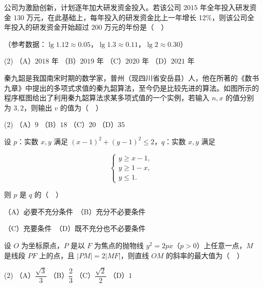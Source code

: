 \begin{question}
公司为激励创新，计划逐年加大研发资金投入。若该公司 \(2015\) 年全年投入研发资金 \(130\) 万元，在此基础上，每年投入的研发资金比上一年增长 12\%，则该公司全年投入的研发资金开始超过 \(200\) 万元的年份是（　）

（参考数据：\(\lg 1.12\approx 0.05\)，\(\lg 1.3\approx 0.11\)，\(\lg 2\approx 0.30\)）

\begin{gkopts}(2)
\task （A）\(2018\) 年
\task （B）\(2019\) 年
\task （C）\(2020\) 年
\task （D）\(2021\) 年
\end{gkopts}

\Needspace{0.4\textheight}
\end{question}
\begin{question}
秦九韶是我国南宋时期的数学家，普州（现四川省安岳县）人，他在所著的《数书九章》中提出的多项式求值的秦九韶算法，至今仍是比较先进的算法。如图所示的程序框图给出了利用秦九韶算法求某多项式值的一个实例，若输入 \(n,x\) 的值分别为 \(3,2\)，则输出 \(v\) 的值为（　）
\nopagebreak[4]
\begin{center}\end{center}
\nopagebreak[4]
\begin{gkopts}(2)
\task （A）\(9\)
\task （B）\(18\)
\task （C）\(20\)
\task （D）\(35\)
\end{gkopts}

\end{question}
\begin{question}
设 \(p\)：实数 \(x,y\) 满足 \((x-1)^{2}+(y-1)^{2}\leqslant 2\)，\(q\)：实数 \(x,y\) 满足

\nopagebreak[4]
\[
\begin{cases}
y\geqslant x-1,\\
y\geqslant 1-x,\\
y\leqslant 1.
\end{cases}
\]

则 \(p\) 是 \(q\) 的（　）

（A）必要不充分条件　（B）充分不必要条件

（C）充要条件　（D）既不充分也不必要条件

\end{question}
\begin{question}
设 \(O\) 为坐标原点，\(P\) 是以 \(F\) 为焦点的抛物线 \(y^{2}=2px\)（\(p>0\)）上任意一点，\(M\) 是线段 \(PF\) 上的点，且 \(|PM|=2|MF|\)，则直线 \(OM\) 的斜率的最大值为（　）

\begin{gkopts}(2)
\task （A）\(\dfrac{\sqrt{3}}{3}\)
\task （B）\(\dfrac{2}{3}\)
\task （C）\(\dfrac{\sqrt{2}}{2}\)
\task （D）\(1\)
\end{gkopts}

\end{question}
